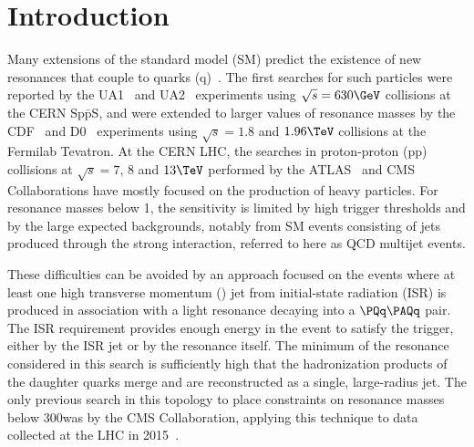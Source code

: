 \documentclass[11pt,twoside,a4paper,cmspaper,final,collab]{cms-tdr}
\begin{document}
\maketitle

\section{Introduction}

Many extensions of the standard model (SM) predict the existence of new resonances that couple to quarks 
(q)~\cite{Anchordoqui:2008di,Cullen:2000ef,ref_diquark,ref_qstar,Baur:1989kv,ref_axi,Chivukula:2011ng,ref_coloron,Han:2010rf,ref_gauge,ref_rsg}. 
The first searches for such particles 
were reported by the UA1~\cite{Albajar:1988rs} 
and UA2~\cite{Alitti:1990kw,Alitti:1993pn} experiments using 
$\sqrt{s}=630\GeV$ collisions at the CERN $\mathrm{Sp\bar{p}S}$, and 
were extended to larger values of resonance masses by the 
CDF~\cite{Abe:1989gz,Abe:1993it,Abe:1995jz,Abe:1997hm,Aaltonen:2008dn} 
and D0~\cite{Abazov:2003tj} experiments using $\sqrt{s}=1.8$ and $1.96\TeV$ collisions 
at the Fermilab Tevatron.
At the CERN LHC, the searches in proton-proton (pp) collisions at $\sqrt{s} = 7$, 8 and $13\TeV$ performed by the 
ATLAS~\cite{Aad:2010ae,Aad:2011aj,Aad:2011fq,ATLAS:2012pu,Aad:2014aqa,ATLAS:2015nsi,Aaboud:2017yvp}
and 
CMS~\cite{Khachatryan:2010jd,Chatrchyan:2011ns,CMS:2012yf,Chatrchyan:2013qha,Khachatryan:2015sja,Khachatryan:2015dcf,Khachatryan:2016ecr,Sirunyan:2016iap} 
Collaborations have mostly focused on the production of heavy particles.
For resonance masses below 1\TeV, 
the sensitivity is limited by high trigger thresholds 
and by the large expected backgrounds, 
notably from SM events consisting of jets produced through the strong 
interaction, referred to here as QCD multijet events.

These
difficulties can be avoided by an approach focused
on the events where at least one high transverse momentum (\pt) jet
from initial-state radiation (ISR) is produced in association with a
light resonance decaying into a $\PQq\PAQq$ pair. 
The ISR requirement provides enough energy in
the event to satisfy the trigger, either by the ISR jet or by the
resonance itself.  The minimum \pt of the resonance considered
in this search is sufficiently high that the hadronization products of
the daughter quarks merge and are reconstructed as a single, large-radius jet.
The only previous search in this topology to place constraints on resonance masses 
below 300\GeV was by the CMS Collaboration, applying this technique to data collected at the LHC in 2015~\cite{Sirunyan:2017dnz}.
\end{document}
